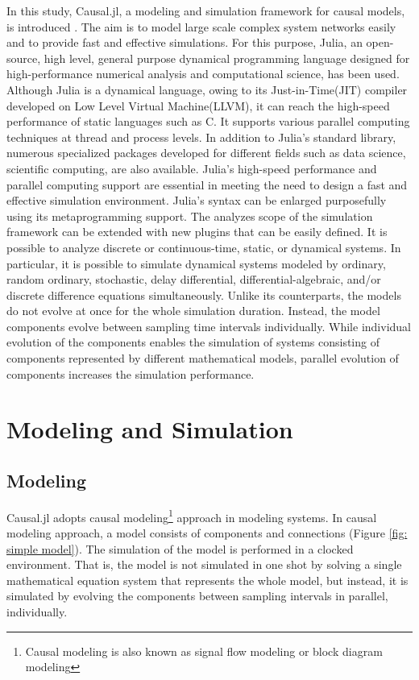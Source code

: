 \documentclass{juliacon}
\begin{document}
In this study, Causal.jl, a modeling and simulation framework for causal models, is introduced \cite{causal}. The aim is to model large scale complex system networks easily and to provide fast and effective simulations. For this purpose, Julia, an open-source, high level, general purpose dynamical programming language designed for high-performance numerical analysis and computational science, has been used. Although Julia is a dynamical language, owing to its Just-in-Time(JIT) compiler developed on Low Level Virtual Machine(LLVM), it can reach the high-speed performance of static languages such as C\cite{bezanson2017julia,julialang}. It supports various parallel computing techniques at thread and process levels. In addition to Julia's standard library, numerous specialized packages developed for different fields such as data science, scientific computing, are also available. Julia's high-speed performance and parallel computing support are essential in meeting the need to design a  fast and effective simulation environment. Julia's syntax can be enlarged purposefully using its metaprogramming support. The analyzes scope of the simulation framework can be extended with new plugins that can be easily defined. It is possible to analyze discrete or continuous-time, static, or dynamical systems. In particular, it is possible to simulate dynamical systems modeled by ordinary, random ordinary, stochastic, delay differential, differential-algebraic, and/or discrete difference equations simultaneously. Unlike its counterparts, the models do not evolve at once for the whole simulation duration. Instead, the model components evolve between sampling time intervals individually. While individual evolution of the components enables the simulation of systems consisting of components represented by different mathematical models, parallel evolution of components increases the simulation performance.




\section{Modeling and Simulation}

\subsection{Modeling}
Causal.jl adopts causal modeling\footnote{Causal modeling is also known as signal flow modeling or block diagram modeling} approach in modeling systems. In causal modeling approach, a model consists of components and connections (Figure \ref{fig: simple model})\cite{matei2012modeling}. The simulation of the model is performed in a clocked environment. That is, the model is not simulated in one shot by solving a single mathematical equation system that represents the whole model, but instead, it is simulated by evolving the components between sampling intervals in parallel, individually.
\end{document}
